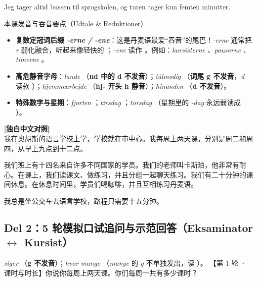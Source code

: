 Jeg tager altid bussen til sprogskolen, og turen tager kun femten minutter.

\begin{tipbox}{本课发音与吞音要点（Udtale \& Reduktioner）}
\begin{itemize}
  \item \textbf{复数定冠词后缀 \textit{-erne / -ene}}：这是丹麦语最爱“吞音”的尾巴！\textit{-erne} 通常把 \textit{r} 弱化融合，听起来像轻快的 ；\textit{-ene} 读作 。例如：\textit{kursisterne} 、\textit{pauserne} 、\textit{timerne} 。
  \item \textbf{高危静音字母}：\textit{lande} （\textbf{nd 中的 d 不发音}）；\textit{tålmodig} （\textbf{词尾 g 不发音}，\textit{d} 读软 ）；\textit{hjemmearbejde} （\textbf{hj- 开头 h 静音}）；\textit{hinanden} （\textbf{d 不发音}）。
  \item \textbf{特殊数字与星期}：\textit{fjorten} ；\textit{tirsdag} ；\textit{torsdag} （星期里的 \textit{-dag} 永远弱读成 ）。
\end{itemize}
\end{tipbox}

\begin{transbox}
\small
\textbf{\color{NCDTeal}[独白中文对照]}\\
我在奥胡斯的语言学校上学，学校就在市中心。我每周上两天课，分别是周二和周四，从早上九点到十二点。

我们班上有十四名来自许多不同国家的学员。我们的老师叫卡斯珀，他非常有耐心。在课上，我们读课文、做练习，并且分组一起聊天练习。我们有二十分钟的课间休息。在休息时间里，学员们喝咖啡，并且互相练习丹麦语。

我总是坐公交车去语言学校，路程只需要十五分钟。
\end{transbox}

\subsection*{Del 2：5 轮模拟口试追问与示范回答（Eksaminator $\leftrightarrow$ Kursist）}

{\textit{siger} （\textbf{g 不发音}）；\textit{hvor mange} （\textit{mange} 的 \textit{g} 不单独发出，读 ）。}
{【第 1 轮 · 课时与时长】你说你每周上两天课。你们每周一共有多少课时？}

